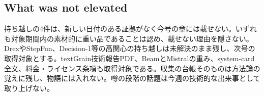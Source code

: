 \subsection*{What was not elevated}
持ち越しの4件は、新しい日付のある証拠がなく今号の章には載せない。いずれも対象期間内の素材的に重い品であることは認め、載せない理由を隠さない。DrexやStepFun、Decision-1等の高関心の持ち越しは未解決のまま残し、次号の取得対象とする。textGrain技術報告PDF、BeamとMistralの重み、system-card全文、料金・ライセンス条項も取得対象である。収集の台帳そのものは方法論の覚えに残し、物語には入れない。噂の段階の話題は今週の技術的な出来事として取り上げない。
